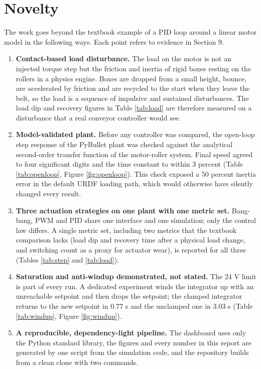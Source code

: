 \documentclass[12pt,a4paper]{article}
\begin{document}
\section{Novelty}

The work goes beyond the textbook example of a PID loop around a linear motor model in the following ways. Each point refers to evidence in Section 9.
\begin{enumerate}[nosep]
  \item \textbf{Contact-based load disturbance.} The load on the motor is not an injected torque step but the friction and inertia of rigid boxes resting on the rollers in a physics engine. Boxes are dropped from a small height, bounce, are accelerated by friction and are recycled to the start when they leave the belt, so the load is a sequence of impulsive and sustained disturbances. The load dip and recovery figures in Table \ref{tab:load} are therefore measured on a disturbance that a real conveyor controller would see.
  \item \textbf{Model-validated plant.} Before any controller was compared, the open-loop step response of the PyBullet plant was checked against the analytical second-order transfer function of the motor-roller system. Final speed agreed to four significant digits and the time constant to within 3 percent (Table \ref{tab:openloop}, Figure \ref{fig:openloop}). This check exposed a 50 percent inertia error in the default URDF loading path, which would otherwise have silently changed every result.
  \item \textbf{Three actuation strategies on one plant with one metric set.} Bang-bang, PWM and PID share one interface and one simulation; only the control law differs. A single metric set, including two metrics that the textbook comparison lacks (load dip and recovery time after a physical load change, and switching count as a proxy for actuator wear), is reported for all three (Tables \ref{tab:step} and \ref{tab:load}).
  \item \textbf{Saturation and anti-windup demonstrated, not stated.} The 24 V limit is part of every run. A dedicated experiment winds the integrator up with an unreachable setpoint and then drops the setpoint; the clamped integrator returns to the new setpoint in 0.77 s and the unclamped one in 3.03 s (Table \ref{tab:windup}, Figure \ref{fig:windup}).
  \item \textbf{A reproducible, dependency-light pipeline.} The dashboard uses only the Python standard library, the figures and every number in this report are generated by one script from the simulation code, and the repository builds from a clean clone with two commands.
\end{enumerate}
\end{document}

